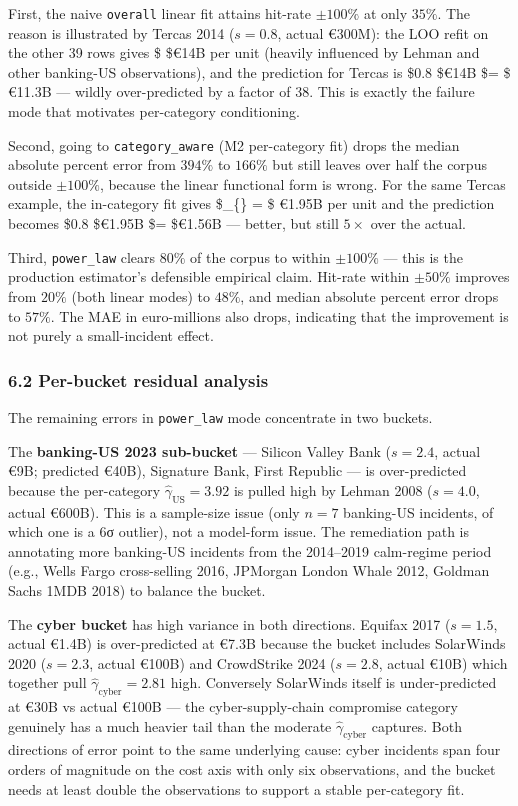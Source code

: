 \documentclass[
]{article}
\begin{document}
First, the naive \texttt{overall} linear fit attains hit-rate
\(\pm 100\%\) at only \(35\%\). The reason is illustrated by Tercas 2014
(\(s = 0.8\), actual €300M): the LOO refit on the other 39 rows gives
\$\hat{\alpha} \approx \$€14B per unit (heavily influenced by Lehman and
other banking-US observations), and the prediction for Tercas is \$0.8
\times \$€14B \$= \$€11.3B --- wildly over-predicted by a factor of 38.
This is exactly the failure mode that motivates per-category
conditioning.

Second, going to \texttt{category\_aware} (M2 per-category fit) drops
the median absolute percent error from \(394\%\) to \(166\%\) but still
leaves over half the corpus outside \(\pm 100\%\), because the linear
functional form is wrong. For the same Tercas example, the in-category
fit gives \$\hat{\alpha}\_\{\} = \$ €1.95B per unit and the
prediction becomes \$0.8 \times \$€1.95B \$= \$€1.56B --- better, but
still \(5\times\) over the actual.

Third, \texttt{power\_law} clears \(80\%\) of the corpus to within
\(\pm 100\%\) --- this is the production estimator's defensible
empirical claim. Hit-rate within \(\pm 50\%\) improves from \(20\%\)
(both linear modes) to \(48\%\), and median absolute percent error drops
to \(57\%\). The MAE in euro-millions also drops, indicating that the
improvement is not purely a small-incident effect.

\subsubsection{6.2 Per-bucket residual
analysis}\label{per-bucket-residual-analysis}

The remaining errors in \texttt{power\_law} mode concentrate in two
buckets.

The \textbf{banking-US 2023 sub-bucket} --- Silicon Valley Bank
(\(s = 2.4\), actual €9B; predicted €40B), Signature Bank, First
Republic --- is over-predicted because the per-category
\(\hat{\gamma}_{\text{US}} = 3.92\) is pulled high by Lehman 2008
(\(s = 4.0\), actual €600B). This is a sample-size issue (only \(n = 7\)
banking-US incidents, of which one is a 6σ outlier), not a model-form
issue. The remediation path is annotating more banking-US incidents from
the 2014--2019 calm-regime period (e.g., Wells Fargo cross-selling 2016,
JPMorgan London Whale 2012, Goldman Sachs 1MDB 2018) to balance the
bucket.

The \textbf{cyber bucket} has high variance in both directions. Equifax
2017 (\(s = 1.5\), actual €1.4B) is over-predicted at €7.3B because the
bucket includes SolarWinds 2020 (\(s = 2.3\), actual €100B) and
CrowdStrike 2024 (\(s = 2.8\), actual €10B) which together pull
\(\hat{\gamma}_{\text{cyber}} = 2.81\) high. Conversely SolarWinds
itself is under-predicted at €30B vs actual €100B --- the
cyber-supply-chain compromise category genuinely has a much heavier tail
than the moderate \(\hat{\gamma}_{\text{cyber}}\) captures. Both
directions of error point to the same underlying cause: cyber incidents
span four orders of magnitude on the cost axis with only six
observations, and the bucket needs at least double the observations to
support a stable per-category fit.
\end{document}
